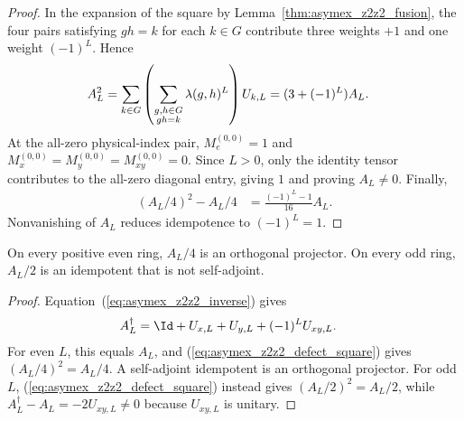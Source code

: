 \begin{proof}
    \leanok
    In the expansion of the square by Lemma~\ref{thm:asymex_z2z2_fusion},
    the four pairs satisfying $gh=k$ for each $k\in G$ contribute
    three weights $+1$ and one weight $(-1)^L$. Hence
    \begin{align}
        A_L^2
         & =\sum_{k\in G}
        \left(\sum_{\substack{g,h\in G \\gh=k}}
        \lambda(g,h)^L\right)U_{k,L}
        =(3+(-1)^L)A_L.
        \notag
    \end{align}
    At the all-zero physical-index pair, $M_e^{(0,0)}=1$ and
    $M_x^{(0,0)}=M_y^{(0,0)}=M_{xy}^{(0,0)}=0$.
    Since $L>0$, only the identity tensor contributes to the all-zero
    diagonal entry, giving $1$ and proving $A_L\neq0$.
    Finally,
    \begin{align}
        (A_L/4)^2-A_L/4
         & =\frac{(-1)^L-1}{16}A_L.
        \label{eq:asymex_z2z2_quarter_difference}
    \end{align}
    Nonvanishing of $A_L$ reduces idempotence to $(-1)^L=1$.
\end{proof}

\begin{lemma}%
    \label{lem:asymex_z2z2_defect_adjoint}
    \leanok
    On every positive even ring, $A_L/4$ is an orthogonal projector.
    On every odd ring, $A_L/2$ is an idempotent that is not
    self-adjoint.
\end{lemma}

\begin{proof}
    \leanok
    Equation~(\ref{eq:asymex_z2z2_inverse}) gives
    \begin{align}
        A_L^\dagger
         & =\Id+U_{x,L}+U_{y,L}+(-1)^LU_{xy,L}.
        \label{eq:asymex_z2z2_defect_adjoint}
    \end{align}
    For even $L$, this equals $A_L$, and
    (\ref{eq:asymex_z2z2_defect_square}) gives $(A_L/4)^2=A_L/4$.
    A self-adjoint idempotent is an orthogonal projector.
    For odd $L$, (\ref{eq:asymex_z2z2_defect_square}) instead gives
    $(A_L/2)^2=A_L/2$, while
    $A_L^\dagger-A_L=-2U_{xy,L}\neq0$ because $U_{xy,L}$ is unitary.
\end{proof}

